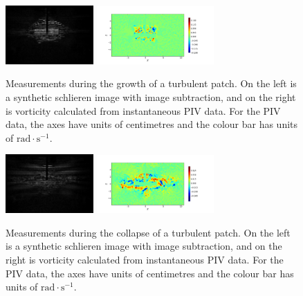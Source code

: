 \documentclass[10pt,a4paper]{article}
\begin{document}
\begin{figure}
\setlength{\unitlength}{1cm}
\begin{center} 
\includegraphics[width=0.3\textwidth]{figures/synthschlieren000137.jpg} \hspace{1cm}
\includegraphics[trim=15mm 5mm 23mm 10mm, clip, width=0.4\textwidth]{figures/buildup.png}
\end{center}
\caption{Measurements during the growth of a turbulent patch.  On the left is a synthetic schlieren image with image subtraction, and on the right is vorticity calculated from instantaneous PIV data.  For the PIV data, the axes have units of centimetres and the colour bar has units of $\mathrm{rad \cdot s^{-1}}$.}
\label{fig:buildup}
\end{figure}

\begin{figure}
\setlength{\unitlength}{1cm}
\begin{center} 
\includegraphics[width=0.3\textwidth]{figures/synthschlieren000150.jpg} \hspace{1cm}
\includegraphics[trim=15mm 5mm 23mm 10mm, clip, width=0.4\textwidth]{figures/collapse.png}
\end{center}
\caption{Measurements during the collapse of a turbulent patch.  On the left is a synthetic schlieren image with image subtraction, and on the right is vorticity calculated from instantaneous PIV data.  For the PIV data, the axes have units of centimetres and the colour bar has units of $\mathrm{rad \cdot s^{-1}}$.}
\label{fig:collapse}
\end{figure}
\end{document}
